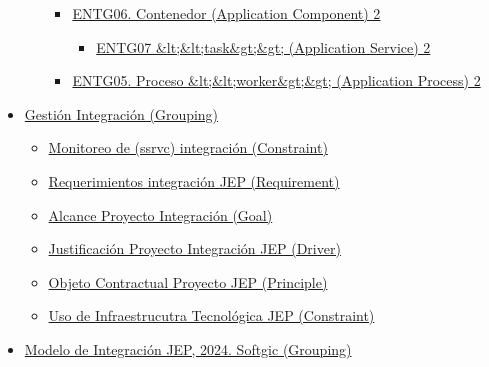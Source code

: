 \documentclass[
  paper=a4,
  ,captions=tableheading
]{scrartcl}
\providecommand{\tightlist}{%
  \setlength{\itemsep}{0pt}\setlength{\parskip}{0pt}}
\begin{document}
\begin{itemize}
\begin{itemize}
    \begin{itemize}
    \tightlist
    \item
      \hyperref[entg06.-contenedor-application-component-2]{ENTG06.
      Contenedor (Application Component) 2}

      \begin{itemize}
      \tightlist
      \item
        \hyperref[entg07-ltlttaskgtgt-application-service-2]{ENTG07
        \&lt;\&lt;task\&gt;\&gt; (Application Service) 2}
      \end{itemize}
    \item
      \hyperref[entg05.-proceso-ltltworkergtgt-application-process-2]{ENTG05.
      Proceso \&lt;\&lt;worker\&gt;\&gt; (Application Process) 2}
    \end{itemize}
  \end{itemize}
\item
  \hyperref[gestiuxf3n-integraciuxf3n-grouping]{Gestión Integración
  (Grouping)}

  \begin{itemize}
  \tightlist
  \item
    \hyperref[monitoreo-de-ssrvc-integraciuxf3n-constraint]{Monitoreo de
    (ssrvc) integración (Constraint)}
  \item
    \hyperref[requerimientos-integraciuxf3n-jep-requirement]{Requerimientos
    integración JEP (Requirement)}
  \item
    \hyperref[alcance-proyecto-integraciuxf3n-goal]{Alcance Proyecto
    Integración (Goal)}
  \item
    \hyperref[justificaciuxf3n-proyecto-integraciuxf3n-jep-driver]{Justificación
    Proyecto Integración JEP (Driver)}
  \item
    \hyperref[objeto-contractual-proyecto-jep-principle]{Objeto
    Contractual Proyecto JEP (Principle)}
  \item
    \hyperref[uso-de-infraestrucutra-tecnoluxf3gica-jep-constraint]{Uso
    de Infraestrucutra Tecnológica JEP (Constraint)}
  \end{itemize}
\item
  \hyperref[modelo-de-integraciuxf3n-jepux2c-2024.-softgic-grouping]{Modelo
  de Integración JEP, 2024. Softgic (Grouping)}


\end{itemize}
\end{document}
